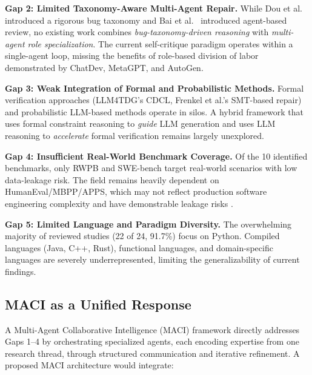 \documentclass[11pt,a4paper]{article}
\begin{document}
\textbf{Gap 2: Limited Taxonomy-Aware Multi-Agent Repair.} While Dou et al.~\cite{dou2026} introduced a rigorous bug taxonomy and Bai et al.~\cite{bai2025agent} introduced agent-based review, no existing work combines \textit{bug-taxonomy-driven reasoning} with \textit{multi-agent role specialization}. The current self-critique paradigm operates within a single-agent loop, missing the benefits of role-based division of labor demonstrated by ChatDev, MetaGPT, and AutoGen.

\textbf{Gap 3: Weak Integration of Formal and Probabilistic Methods.} Formal verification approaches (LLM4TDG's CDCL, Frenkel et al.'s SMT-based repair) and probabilistic LLM-based methods operate in silos. A hybrid framework that uses formal constraint reasoning to \textit{guide} LLM generation and uses LLM reasoning to \textit{accelerate} formal verification remains largely unexplored.

\textbf{Gap 4: Insufficient Real-World Benchmark Coverage.} Of the 10 identified benchmarks, only RWPB and SWE-bench target real-world scenarios with low data-leakage risk. The field remains heavily dependent on HumanEval/MBPP/APPS, which may not reflect production software engineering complexity and have demonstrable leakage risks \cite{dou2026}.

\textbf{Gap 5: Limited Language and Paradigm Diversity.} The overwhelming majority of reviewed studies (22 of 24, 91.7\%) focus on Python. Compiled languages (Java, C++, Rust), functional languages, and domain-specific languages are severely underrepresented, limiting the generalizability of current findings.

\subsection{MACI as a Unified Response}

A Multi-Agent Collaborative Intelligence (MACI) framework directly addresses Gaps 1--4 by orchestrating specialized agents, each encoding expertise from one research thread, through structured communication and iterative refinement. A proposed MACI architecture would integrate:
\end{document}
